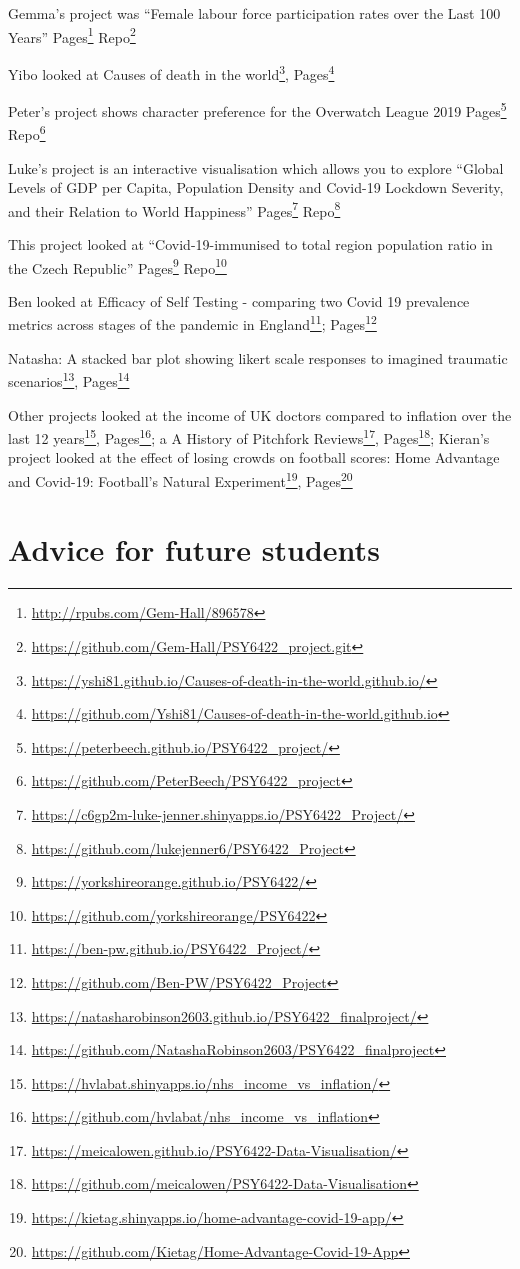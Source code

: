 \documentclass[
  12pt,
  a5paper,
]{book}
\DeclareRobustCommand{\href}[2]{#2\footnote{\url{#1}}}
\begin{document}
Gemma's project was ``Female labour force participation rates over the Last 100 Years''
\href{http://rpubs.com/Gem-Hall/896578}{Pages}
\href{https://github.com/Gem-Hall/PSY6422_project.git}{Repo}

Yibo looked at \href{https://yshi81.github.io/Causes-of-death-in-the-world.github.io/}{Causes of death in the world}, \href{https://github.com/Yshi81/Causes-of-death-in-the-world.github.io}{Pages}

Peter's project shows character preference for the Overwatch League 2019
\href{https://peterbeech.github.io/PSY6422_project/}{Pages}
\href{https://github.com/PeterBeech/PSY6422_project}{Repo}

Luke's project is an interactive visualisation which allows you to explore ``Global Levels of GDP per Capita, Population Density and Covid-19 Lockdown Severity, and their Relation to World Happiness''
\href{https://c6gp2m-luke-jenner.shinyapps.io/PSY6422_Project/}{Pages} \href{https://github.com/lukejenner6/PSY6422_Project}{Repo}

This project looked at ``Covid-19-immunised to total region population ratio in the Czech Republic''
\href{https://yorkshireorange.github.io/PSY6422/}{Pages}
\href{https://github.com/yorkshireorange/PSY6422}{Repo}

Ben looked at \href{https://ben-pw.github.io/PSY6422_Project/}{Efficacy of Self Testing - comparing two Covid 19 prevalence metrics across stages of the pandemic in England}; \href{https://github.com/Ben-PW/PSY6422_Project}{Pages}

Natasha: \href{https://natasharobinson2603.github.io/PSY6422_finalproject/}{A stacked bar plot showing likert scale responses to imagined traumatic scenarios},
\href{https://github.com/NatashaRobinson2603/PSY6422_finalproject}{Pages}

Other projects looked \href{https://hvlabat.shinyapps.io/nhs_income_vs_inflation/}{at the income of UK doctors compared to inflation over the last 12 years}, \href{https://github.com/hvlabat/nhs_income_vs_inflation}{Pages}; a \href{https://meicalowen.github.io/PSY6422-Data-Visualisation/}{A History of Pitchfork Reviews}, \href{https://github.com/meicalowen/PSY6422-Data-Visualisation}{Pages}; Kieran's project looked at the effect of losing crowds on football scores: \href{https://kietag.shinyapps.io/home-advantage-covid-19-app/}{Home Advantage and Covid-19: Football's Natural Experiment}, \href{https://github.com/Kietag/Home-Advantage-Covid-19-App}{Pages}

\hypertarget{advice-for-future-students}{%
\section{Advice for future students}\label{advice-for-future-students}}
\end{document}
